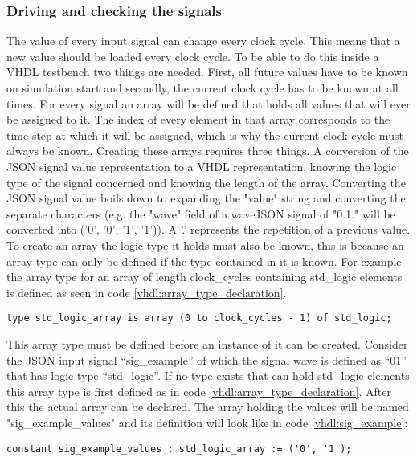 \subsubsection{Driving and checking the signals}
The value of every input signal can change every clock cycle. This means that a new value should be loaded every clock cycle. To be able to do this inside a VHDL testbench two things are needed. First, all future values have to be known on simulation start and secondly, the current clock cycle has to be known at all times. For every signal an array will be defined that holds all values that will ever be assigned to it. The index of every element in that array corresponds to the time step at which it will be assigned, which is why the current clock cycle must always be known.
\npar
Creating these arrays requires three things. A conversion of the JSON signal value representation to a VHDL representation, knowing the logic type of the signal concerned and knowing the length of the array.
\npar
Converting the JSON signal value boils down to expanding the "value" string and converting the separate characters (e.g. the "wave" field of a waveJSON signal of "0.1." will be converted into ('0', '0', '1', '1')). A '.' represents the repetition of a previous value.
\npar
To create an array the logic type it holds must also be known, this is because an array type can only be defined if the type contained in it is known. For example the array type for an array of length clock\_cycles containing std\_logic elements is defined as seen in code \ref{vhdl:array_type_declaration}.
\begin{lstlisting}[style=vhdl, caption={Declaration of an std\_logic array type of lenght clock\_cycles}, label={vhdl:array_type_declaration}]
type std_logic_array is array (0 to clock_cycles - 1) of std_logic;
\end{lstlisting}\noindent
This array type must be defined before an instance of it can be created. Consider the JSON input signal “sig\_example” of which the signal wave is defined as “01” that has logic type “std\_logic”. If no type exists that can hold std\_logic elements this array type is first defined as in code \ref{vhdl:array_type_declaration}. After this the actual array can be declared. The array holding the values will be named "sig\_example\_values" and its definition will look like in code \ref{vhdl:sig_example}:
\begin{lstlisting}[style=vhdl, caption={Definition of a std\_logic array}, label={vhdl:sig_example}]
constant sig_example_values : std_logic_array := ('0', '1');
\end{lstlisting}\noindent
